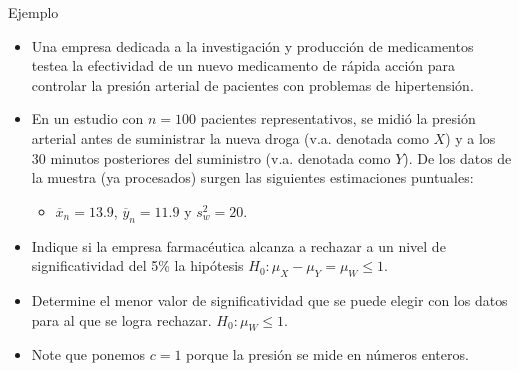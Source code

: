 \documentclass{beamer}
\theoremstyle{definition}
\begin{document}



  




\begin{frame}{\color{rosee}Ejemplo}\small
\begin{itemize}
    \item Una empresa dedicada a la investigación y producción de medicamentos testea la efectividad de un nuevo medicamento de rápida acción para controlar la presión arterial de pacientes con problemas de hipertensión.\medskip
    \item En un estudio con $n=100$ pacientes representativos, se midió la presión arterial antes de suministrar la nueva droga (v.a. denotada como $X$) y a los 30 minutos posteriores del suministro (v.a. denotada como $Y$). De los datos de la muestra (ya procesados) surgen las siguientes estimaciones puntuales:\medskip
    \begin{itemize}
        \item $\overline{x}_n=13.9$, $\overline{y}_n=11.9$ y $s_w^2=20$.\medskip
    \end{itemize}
\item Indique si la empresa farmacéutica alcanza a rechazar a un nivel de significatividad del 5\% la hipótesis $H_0:\mu_X-\mu_Y=\mu_W\leq 1$.\medskip
\item Determine el menor valor de significatividad que se puede elegir con los datos para al que se logra rechazar. $H_0:\mu_W\leq 1$. 

\item Note que ponemos $c=1$ porque la presión se mide en números enteros.
\end{itemize}
\end{frame}
\end{document}
